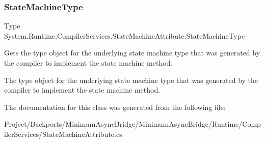 \subsubsection{\texorpdfstring{State\+Machine\+Type}{StateMachineType}}
{\footnotesize\ttfamily Type System.\+Runtime.\+Compiler\+Services.\+State\+Machine\+Attribute.\+State\+Machine\+Type\hspace{0.3cm}{\ttfamily [get]}}



Gets the type object for the underlying state machine type that was generated by the compiler to implement the state machine method. 

The type object for the underlying state machine type that was generated by the compiler to implement the state machine method. 

The documentation for this class was generated from the following file\+:\begin{DoxyCompactItemize}
\item 
Project/\+Backports/\+Minimum\+Async\+Bridge/\+Minimum\+Async\+Bridge/\+Runtime/\+Compiler\+Services/State\+Machine\+Attribute.\+cs\end{DoxyCompactItemize}
